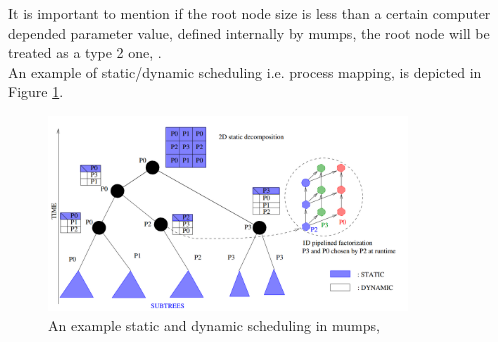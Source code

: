 It is important to mention if the root node size is less than a certain computer depended parameter value, defined internally by \acrshort{mumps}, the root node will be treated as a type 2 one, \cite{mumps-manual}.\\


An example of static/dynamic scheduling i.e. process mapping, is depicted in Figure \ref{fig:mumps:mapping-and-scheduling}.\\


\figpointer{\ref{fig:mumps:mapping-and-scheduling}}
\begin{figure}[htpb]
  \centering
  \includegraphics[width=0.85\textwidth]{figures/chapter-2/mumps-task-data-parallelism-2.png}
    \caption{An example static and dynamic scheduling in \acrshort{mumps}, \cite{l2012multifrontal}}
\label{fig:mumps:mapping-and-scheduling}
\end{figure}


